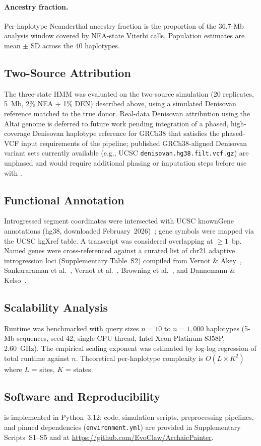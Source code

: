 \paragraph{Ancestry fraction.}
Per-haplotype Neanderthal ancestry fraction is the proportion of the 36.7-Mb analysis window
covered by NEA-state Viterbi calls.
Population estimates are mean $\pm$ SD across the 40 haplotypes.

\subsection*{Two-Source Attribution}
\label{sec:attribution}

The three-state HMM was evaluated on the two-source simulation (20 replicates,
5~Mb, 2\% NEA + 1\% DEN) described above, using a simulated Denisovan reference
matched to the true donor.
Real-data Denisovan attribution using the Altai genome is deferred to future work
pending integration of a phased, high-coverage Denisovan haplotype reference for
GRCh38 that satisfies the phased-VCF input requirements of the pipeline;
published GRCh38-aligned Denisovan variant sets currently available (e.g., UCSC
\texttt{denisovan.hg38.filt.vcf.gz}) are unphased and would require additional
phasing or imputation steps before use with \AP{}.

\subsection*{Functional Annotation}

Introgressed segment coordinates were intersected with UCSC knownGene
annotations (hg38, downloaded February~2026)~\citep{kent2002human};
gene symbols were mapped via the UCSC kgXref table.
A transcript was considered overlapping at $\geq 1$~bp.
Named genes were cross-referenced against a curated list of chr21 adaptive
introgression loci (Supplementary Table~S2) compiled from Vernot \& Akey~\citeyear{vernot2014resurrecting},
Sankararaman et al.~\citeyear{sankararaman2014genomic},
Vernot et al.~\citeyear{vernot2016excavating},
Browning et al.~\citeyear{browning2018ancestry},
and Dannemann \& Kelso~\citeyear{dannemann2017contribution}.

\subsection*{Scalability Analysis}

Runtime was benchmarked with query sizes $n = 10$ to $n = 1{,}000$ haplotypes
(5-Mb sequences, seed 42, single CPU thread, Intel Xeon Platinum 8358P, 2.60~GHz).
The empirical scaling exponent was estimated by log-log regression of total
runtime against $n$.
Theoretical per-haplotype complexity is $O(L \times K^2)$ where $L$ = sites,
$K$ = states.

\subsection*{Software and Reproducibility}

\AP{} is implemented in Python~3.12; code, simulation scripts, preprocessing
pipelines, and pinned dependencies (\texttt{environment.yml}) are provided
in Supplementary Scripts~S1--S5 and at \url{https://github.com/EvoClaw/ArchaicPainter}.
